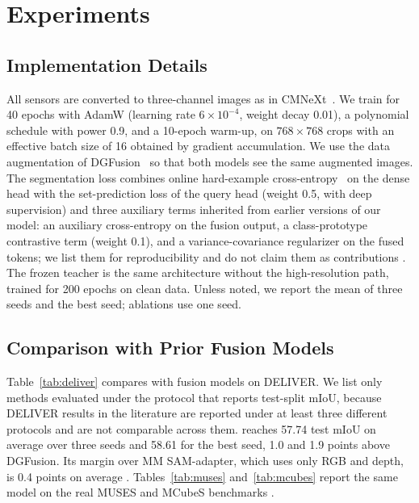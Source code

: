 \section{Experiments}\label{sec:exp}
\subsection{Implementation Details}
All sensors are converted to three-channel images as in CMNeXt~\cite{cmnext2023}. We train for 40 epochs with AdamW (learning rate $6\times10^{-4}$, weight decay 0.01), a polynomial schedule with power 0.9, and a 10-epoch warm-up, on $768\times768$ crops with an effective batch size of 16 obtained by gradient accumulation. We use the data augmentation of DGFusion~\cite{dgfusion2026} so that both models see the same augmented images. The segmentation loss combines online hard-example cross-entropy~\cite{ohem2016} on the dense head with the set-prediction loss of the query head (weight 0.5, with deep supervision) and three auxiliary terms inherited from earlier versions of our model: an auxiliary cross-entropy on the fusion output, a class-prototype contrastive term (weight 0.1), and a variance-covariance regularizer on the fused tokens; we list them for reproducibility and do not claim them as contributions . The frozen teacher is the same architecture without the high-resolution path, trained for 200 epochs on clean data. Unless noted, we report the mean of three seeds and the best seed; ablations use one seed.

\subsection{Comparison with Prior Fusion Models}
Table~\ref{tab:deliver} compares \ours{} with fusion models on DELIVER. We list only methods evaluated under the protocol that reports test-split mIoU, because DELIVER results in the literature are reported under at least three different protocols and are not comparable across them. \ours{} reaches 57.74 test mIoU on average over three seeds and 58.61 for the best seed, 1.0 and 1.9 points above DGFusion. Its margin over MM SAM-adapter, which uses only RGB and depth, is 0.4 points on average . Tables~\ref{tab:muses} and~\ref{tab:mcubes} report the same model on the real MUSES and MCubeS benchmarks .


